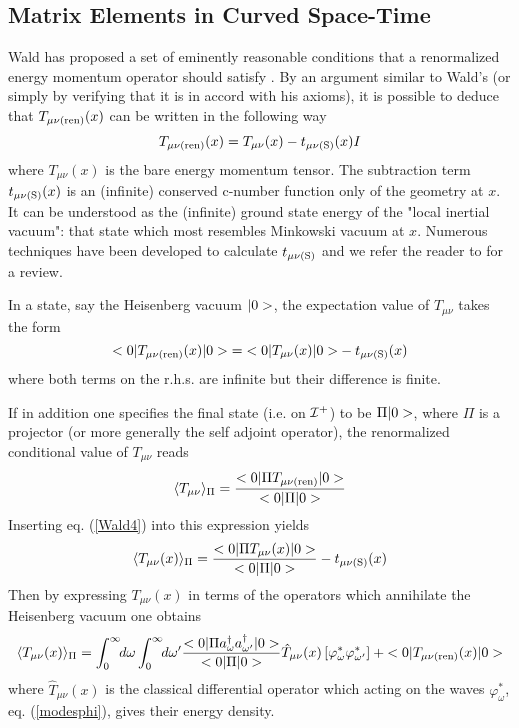 \subsection{Matrix Elements in Curved Space-Time}

Wald has proposed a set of eminently reasonable
conditions that a renormalized energy
momentum operator should satisfy \cite{wald}.
By an argument  similar to
Wald's (or
simply by verifying that it is in accord with his axioms), it is
 possible to deduce that  $T_{\mu \nu ({\rm ren})} (x)$ can
be
written in the following way
\begin{equation}
T_{\mu \nu ({\rm ren})} (x) =
T_{\mu \nu} (x) - t_{\mu \nu ({\rm S})} (x) I
\label{Wald4}
\end{equation}
where $T_{\mu
\nu} (x)$ is the bare energy momentum tensor.  The subtraction term  $t_{\mu
\nu ({\rm S})} (x)$ is an (infinite) conserved c-number function only of the
geometry at $x$. It can be understood\cite{mpblocal}\cite{mas}
as the (infinite) ground state
energy of the "local inertial vacuum": that state which most resembles
Minkowski vacuum at $x$. Numerous techniques have been
developed
to
calculate $t_{\mu \nu ({\rm S})}$ and we refer the reader to
\cite{birreld}
for a
review.

In a state, say the Heisenberg vacuum
$\mbox{$ \vert 0 > $}$, the expectation value of $T_{\mu\nu}$
 takes the form
\begin{equation}
 \mbox{$ \mbox{$ < 0 \vert $} T_{\mu \nu
({\rm ren})} (x) \mbox{$ \vert 0 > $} $} = \mbox{$ \mbox{$ < 0 \vert $} T_{\mu \nu } (x) \mbox{$ \vert 0 > $} $} -  t_{\mu \nu
({\rm S})} (x)
\label{beware}
\end{equation}
 where both terms on the r.h.s. are infinite but
their difference is finite.

If in addition one specifies the final state (i.e. on $\cal{I}^+$)
to be $\Pi \mbox{$ \vert 0 > $}$, where
$\Pi$ is a projector (or more generally the self
adjoint operator), the renormalized conditional value of $T_{\mu \nu}$
reads
\begin{equation}
\langle T_{\mu \nu } \rangle_\Pi = {
\mbox{$ \mbox{$ < 0 \vert $} \Pi T_{\mu \nu ({\rm ren})}  \mbox{$ \vert 0 > $} $} \over  \mbox{$ \mbox{$ < 0 \vert $} \Pi  \mbox{$ \vert 0 > $} $} }
 \label{bh11}
\end{equation}
 Inserting eq. (\ref{Wald4})
 into this
expression yields
 \begin{equation}
\langle T_{\mu \nu }(x)\rangle_{\Pi} = {
\mbox{$ \mbox{$ < 0 \vert $} \Pi {T_{\mu \nu }}(x)  \mbox{$ \vert 0 > $} $} \over  \mbox{$ \mbox{$ < 0 \vert $} \Pi  \mbox{$ \vert 0 > $} $} } -
t_{\mu \nu ({\rm S})}(x)
\label{bh12}
\end{equation}
Then by expressing ${T_{\mu \nu }}(x)$ in terms of the operators which
annihilate the Heisenberg vacuum one obtains
\begin{equation}
\langle T_{\mu \nu }(x)\rangle_{\Pi}  = \int_0^\infty\!\! d \omega
\int_0^\infty\!\! d \omega^{\prime} {
\mbox{$ \mbox{$ < 0 \vert $} \Pi a_{\omega}^{\dagger} a_{\omega^{\prime}}^{\dagger}
  \mbox{$ \vert 0 > $} $} \over  \mbox{$ \mbox{$ < 0 \vert $} \Pi  \mbox{$ \vert 0 > $} $} } \hat T_{\mu \nu }
(x)\left[ \varphi^*_\omega \varphi^*_{\omega^{\prime}}
\right] +
\mbox{$ \mbox{$ < 0 \vert $} T_{\mu \nu
({\rm ren})} (x) \mbox{$ \vert 0 > $} $}
\label{2terms}
\end{equation}
where $ \hat T_{\mu \nu } (x)$
is the classical differential operator
which acting on the waves $ \varphi^*_\omega$, eq. (\ref{modesphi}),
 gives their energy
density.

